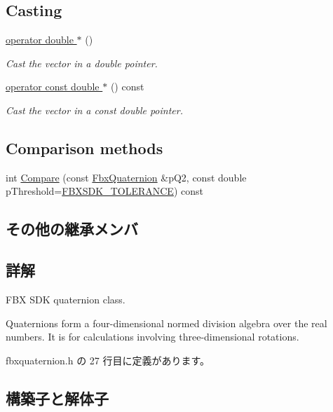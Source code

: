 \subsection*{Casting}
\begin{DoxyCompactItemize}
\item 
\hyperlink{class_fbx_quaternion_a6cef0915096bd157458f8fd02aa3e904}{operator double $\ast$} ()
\begin{DoxyCompactList}\small\item\em Cast the vector in a double pointer. \end{DoxyCompactList}\item 
\hyperlink{class_fbx_quaternion_a0ff9bd06a5800ce91388eb185cdd8dc8}{operator const double $\ast$} () const
\begin{DoxyCompactList}\small\item\em Cast the vector in a const double pointer. \end{DoxyCompactList}\end{DoxyCompactItemize}
\subsection*{Comparison methods}
\begin{DoxyCompactItemize}
\item 
int \hyperlink{class_fbx_quaternion_a6e2200de81315f788b0bf80d553f1f65}{Compare} (const \hyperlink{class_fbx_quaternion}{Fbx\+Quaternion} \&p\+Q2, const double p\+Threshold=\hyperlink{fbxtypes_8h_acf3cd6f208edb42ad9c9abbc1f7feea0}{F\+B\+X\+S\+D\+K\+\_\+\+T\+O\+L\+E\+R\+A\+N\+CE}) const
\end{DoxyCompactItemize}
\subsection*{その他の継承メンバ}


\subsection{詳解}
F\+BX S\+DK quaternion class.

Quaternions form a four-\/dimensional normed division algebra over the real numbers. It is for calculations involving three-\/dimensional rotations. 

 fbxquaternion.\+h の 27 行目に定義があります。



\subsection{構築子と解体子}
\mbox{\label{class_fbx_quaternion_acfb222e84428e32ecc6258f1d18fc92b}} 
